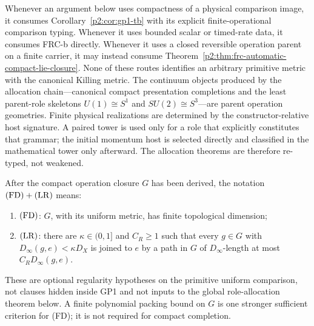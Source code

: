 \documentclass[12pt,a4paper]{article}
\begin{document}
\begin{remark}
\label{p2:rem:gp1-tb-consumption}
Whenever an argument below uses compactness of a physical comparison image,
it consumes Corollary~\ref{p2:cor:gp1-tb} with its explicit finite-operational
comparison typing.  Whenever it uses bounded scalar or timed-rate data, it
consumes FRC-b directly.  Whenever it uses a closed reversible operation
parent on a finite carrier, it may instead consume
Theorem~\ref{p2:thm:frc-automatic-compact-lie-closure}.  None of these routes
identifies an arbitrary primitive metric with the canonical Killing metric.
The continuum objects produced by the allocation chain---canonical compact
presentation completions and the least parent-role skeletons
\(U(1)\cong S^1\) and \(SU(2)\cong S^3\)---are parent operation geometries.
Finite physical realizations are determined by the constructor-relative host
signature.  A paired tower is used only for a role that explicitly constitutes
that grammar; the initial momentum host is selected directly and classified in
the mathematical tower only afterward.  The allocation theorems are therefore
re-typed, not weakened.
\end{remark}

\begin{definition}
\label{p2:def:lie-regularity-conditions}
After the compact operation closure \(G\) has been derived, the notation
\(({\rm FD})+({\rm LR})\) means:
\begin{enumerate}[label=(\roman*), leftmargin=2em]
\item \(({\rm FD})\): \(G\), with its uniform metric, has finite topological
dimension;
\item \(({\rm LR})\): there are \(\kappa\in(0,1]\) and \(C_R\ge1\) such that
every \(g\in G\) with \(D_\infty(g,e)<\kappa D_X\) is joined to \(e\) by a
path in \(G\) of \(D_\infty\)-length at most
\(C_R D_\infty(g,e)\).
\end{enumerate}
These are optional regularity hypotheses on the primitive uniform comparison,
not clauses hidden inside GP1 and not inputs to the global role-allocation
theorem below.
A finite polynomial packing bound on \(G\) is one stronger sufficient
criterion for (FD); it is not required for compact completion.
\end{definition}
\end{document}
